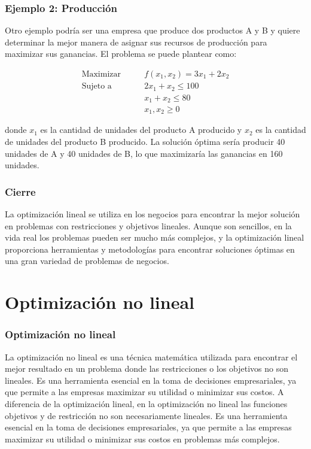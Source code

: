 \documentclass{beamer}
\begin{document}
    \begin{frame}
    \frametitle{Ejemplo 2: Producción}
    
    Otro ejemplo podría ser una empresa que produce dos productos A y B y quiere determinar la mejor manera de asignar sus recursos de producción para maximizar sus ganancias. El problema se puede plantear como:
    
    \begin{align*}
    \text{Maximizar} \qquad & f(x_1, x_2) = 3x_1 + 2x_2 \\
    \text{Sujeto a} \qquad & 2x_1 + x_2 \leq 100 \\
    & x_1 + x_2 \leq 80 \\
    & x_1, x_2 \geq 0 \
    \end{align*}
    
    donde $x_1$ es la cantidad de unidades del producto A producido y $x_2$ es la cantidad de unidades del producto B producido. La solución óptima sería producir 40 unidades de A y 40 unidades de B, lo que maximizaría las ganancias en 160 unidades.
    
    \end{frame}

    \begin{frame}
        \frametitle{Cierre}
       La optimización lineal se utiliza en los negocios para encontrar la mejor solución en problemas con restricciones y objetivos lineales. Aunque son sencillos, en la vida real los problemas pueden ser mucho más complejos, y la optimización lineal proporciona herramientas y metodologías para encontrar soluciones óptimas en una gran variedad de problemas de negocios.
        
    \end{frame}
\section{Optimización no lineal}

\begin{frame}
    \frametitle{Optimización no lineal}
    
    La optimización no lineal es una técnica matemática utilizada para encontrar el mejor resultado en un problema donde las restricciones o los objetivos no son lineales. Es una herramienta esencial en la toma de decisiones empresariales, ya que permite a las empresas maximizar su utilidad o minimizar sus costos.
    A diferencia de la optimización lineal, en la optimización no lineal las funciones objetivos y de restricción no son necesariamente lineales. Es una herramienta esencial en la toma de decisiones empresariales, ya que permite a las empresas maximizar su utilidad o minimizar sus costos en problemas más complejos.

\end{frame}
\end{document}
